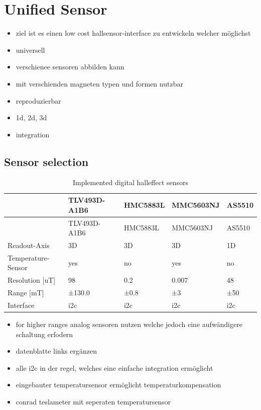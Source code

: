 \hypertarget{unified-sensor}{%
\chapter{Unified Sensor}\label{unified-sensor}}

\begin{itemize}
\tightlist
\item
  ziel ist es einen low cost hallsensor-interface zu entwickeln welcher
  möglichst
\item
  universell
\item
  verschienee sensoren abbilden kann
\item
  mit verschienden magneten typen und formen nutzbar
\item
  reproduzierbar
\item
  1d, 2d, 3d
\item
  integration
\end{itemize}

\hypertarget{sensor-selection}{%
\section{Sensor selection}\label{sensor-selection}}

\begin{longtable}[]{@{}lllll@{}}
\caption{Implemented digital halleffect sensors
\label{Implemented_digital_halleffect_sensors.csv}}\tabularnewline
\toprule
& TLV493D-A1B6 & HMC5883L & MMC5603NJ & AS5510\tabularnewline
\midrule
\endfirsthead
\toprule
& TLV493D-A1B6 & HMC5883L & MMC5603NJ & AS5510\tabularnewline
\midrule
\endhead
Readout-Axis & 3D & 3D & 3D & 1D\tabularnewline
Temperature-Sensor & yes & no & yes & no\tabularnewline
Resolution {[}uT{]} & 98 & 0.2 & 0.007 & 48\tabularnewline
Range {[}mT{]} & ±130.0 & ±0.8 & ±3 & ±50\tabularnewline
Interface & \gls{i2c} & \gls{i2c} & \gls{i2c} & \gls{i2c}\tabularnewline
\bottomrule
\end{longtable}

\begin{itemize}
\tightlist
\item
  for higher ranges analog sensoren nutzen welche jedoch eine
  aufwändigere schaltung erfodern
\item
  datenblatte links ergänzen
\item
  alle i2c in der regel, welches eine einfache integration ermöglicht
\item
  eingebauter temperatursensor ermöglicht temperaturkompensation
\item
  conrad teslameter mit seperaten temperatursensor
\end{itemize}

